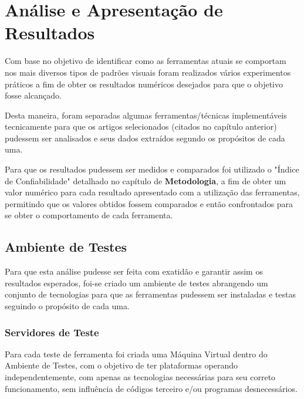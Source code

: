 \chapter{Análise e Apresentação de Resultados}


Com base no objetivo de identificar como as ferramentas atuais se comportam nos mais diversos tipos de padrões visuais foram realizados vários experimentos práticos a fim de obter os resultados numéricos desejados para que o objetivo fosse alcançado.

Desta maneira, foram separadas algumas ferramentas/técnicas implementáveis tecnicamente para que os artigos selecionados (citados no capítulo anterior) pudessem ser analisados e seus dados extraídos segundo os propósitos de cada uma.


Para que os resultados pudessem ser medidos e comparados foi utilizado o "Índice de Confiabilidade" detalhado no capítulo de \textbf{Metodologia}, a fim de obter um valor numérico para cada resultado apresentado com a utilização das ferramentas, permitindo que os valores obtidos fossem comparados e então confrontados para se obter o comportamento de cada ferramenta.



\section{Ambiente de Testes}

Para que esta análise pudesse ser feita com exatidão e garantir assim os resultados esperados, foi-se criado um ambiente de testes abrangendo um conjunto de tecnologias para que as ferramentas pudessem ser instaladas e testas seguindo o propósito de cada uma.

\subsection{Servidores de Teste}

Para cada teste de ferramenta foi criada uma Máquina Virtual dentro do Ambiente de Testes, com o objetivo de ter plataformas operando independentemente, com apenas as tecnologias necessárias para seu correto funcionamento, sem influência de códigos terceiro e/ou programas desnecessários.

